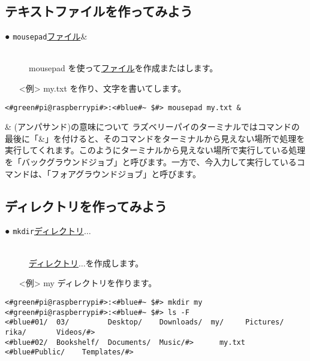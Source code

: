 \subsection{テキストファイルを作ってみよう}
\begin{description}
\item[● \texttt{mousepad}\textvisiblespace \underline{ファイル}\textvisiblespace \&]\mbox{}\\
mousepad を使って\underline{ファイル}を作成またはします。
\end{description}
\newpage
\begin{itemize}
\item[<例>]my.txt を作り、文字を書いてします。
\end{itemize}
\begin{lstlisting}[caption=mousepadの例, label=mousepad]
<#green#pi@raspberrypi#>:<#blue#~ $#> mousepad my.txt &
\end{lstlisting}

\begin{itembox}[c]{\& (アンパサンド)の意味について}
    ラズベリーパイのターミナルではコマンドの最後に「\&」を付けると、そのコマンドをターミナルから見えない場所で処理を実行してくれます。このようにターミナルから見えない場所で実行している処理を「バックグラウンドジョブ」と呼びます。一方で、今入力して実行しているコマンドは、「フォアグラウンドジョブ」と呼びます。
\end{itembox}

\subsection{ディレクトリを作ってみよう}
\begin{description}
\item[● \texttt{mkdir}\textvisiblespace \underline{ディレクトリ}$\ldots$]\mbox{}\\
\underline{ディレクトリ}$\ldots$を作成します。
\end{description}
\begin{itemize}
\item[<例>]my ディレクトリを作ります。
\end{itemize}
\begin{lstlisting}[caption=mkdirの例, label=mkdir]
<#green#pi@raspberrypi#>:<#blue#~ $#> mkdir my
<#green#pi@raspberrypi#>:<#blue#~ $#> ls -F
<#blue#01/  03/         Desktop/    Downloads/  my/     Pictures/  rika/       Videos/#>
<#blue#02/  Bookshelf/  Documents/  Music/#>      my.txt  <#blue#Public/    Templates/#>
\end{lstlisting}

